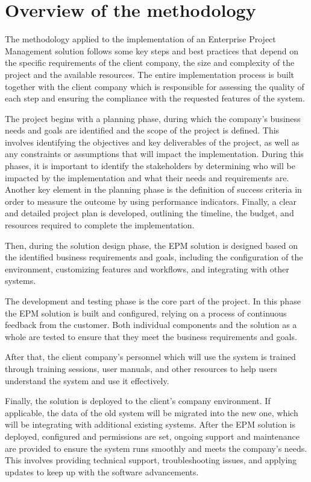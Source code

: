 \documentclass[12pt,a4paper,openright,twoside]{book}
\begin{document}
\section{Overview of the methodology}

The methodology applied to the implementation of an Enterprise Project Management solution follows some key steps and best practices that depend on the specific requirements of the client company, the size and complexity of the project and the available resources.
%
The entire implementation process is built together with the client company which is responsible for assessing the quality of each step and ensuring the compliance with the requested features of the system.

The project begins with a planning phase, during which the company's business needs and goals are identified and the scope of the project is defined.
%
This involves identifying the objectives and key deliverables of the project, as well as any constraints or assumptions that will impact the implementation.
%
During this phases, it is important to identify the stakeholders by determining who will be impacted by the implementation and what their needs and requirements are.
%
Another key element in the planning phase is the definition of success criteria in order to measure the outcome by using performance indicators.
%
Finally, a clear and detailed project plan is developed, outlining the timeline, the budget, and resources required to complete the implementation.

Then, during the solution design phase, the EPM solution is designed based on the identified business requirements and goals, including the configuration of the environment, customizing features and workflows, and integrating with other systems.

The development and testing phase is the core part of the project.
%
In this phase the EPM solution is built and configured, relying on a process of continuous feedback from the customer.
%
Both individual components and the solution as a whole are tested to ensure that they meet the business requirements and goals.

After that, the client company's personnel which will use the system is trained through training sessions, user manuals, and other resources to help users understand the system and use it effectively.

Finally, the solution is deployed to the client's company environment.
%
If applicable, the data of the old system will be migrated into the new one, which will be integrating with additional existing systems.
%
After the EPM solution is deployed, configured and permissions are set, ongoing support and maintenance are provided to ensure the system runs smoothly and meets the company's needs.
%
This involves providing technical support, troubleshooting issues, and applying updates to keep up with the software advancements.
\end{document}
